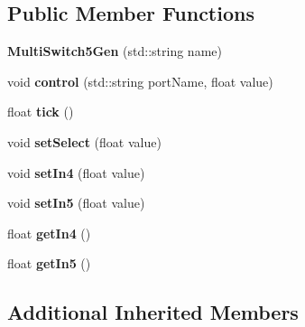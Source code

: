 \subsection*{Public Member Functions}
\begin{DoxyCompactItemize}
\item 
\hypertarget{classunit_1_1MultiSwitch5Gen_a61feb713c9bf9e11cb7f8da0c27b8faf}{{\bfseries Multi\-Switch5\-Gen} (std\-::string name)}\label{classunit_1_1MultiSwitch5Gen_a61feb713c9bf9e11cb7f8da0c27b8faf}

\item 
\hypertarget{classunit_1_1MultiSwitch5Gen_a22d5724ba74b064282da08c9600bed87}{void {\bfseries control} (std\-::string port\-Name, float value)}\label{classunit_1_1MultiSwitch5Gen_a22d5724ba74b064282da08c9600bed87}

\item 
\hypertarget{classunit_1_1MultiSwitch5Gen_a4c357bd87f34841ccfb6a95f9a820384}{float {\bfseries tick} ()}\label{classunit_1_1MultiSwitch5Gen_a4c357bd87f34841ccfb6a95f9a820384}

\item 
\hypertarget{classunit_1_1MultiSwitch5Gen_ab2c8a47e7d29e01183a02d9fbf60f0ed}{void {\bfseries set\-Select} (float value)}\label{classunit_1_1MultiSwitch5Gen_ab2c8a47e7d29e01183a02d9fbf60f0ed}

\item 
\hypertarget{classunit_1_1MultiSwitch5Gen_a47554a04fc8a495a2ce60ae87460da8d}{void {\bfseries set\-In4} (float value)}\label{classunit_1_1MultiSwitch5Gen_a47554a04fc8a495a2ce60ae87460da8d}

\item 
\hypertarget{classunit_1_1MultiSwitch5Gen_a7073be5cc2e0383aecefdf54c9dec714}{void {\bfseries set\-In5} (float value)}\label{classunit_1_1MultiSwitch5Gen_a7073be5cc2e0383aecefdf54c9dec714}

\item 
\hypertarget{classunit_1_1MultiSwitch5Gen_a97d0f025afcb8b7b5167ccaf244fc9ed}{float {\bfseries get\-In4} ()}\label{classunit_1_1MultiSwitch5Gen_a97d0f025afcb8b7b5167ccaf244fc9ed}

\item 
\hypertarget{classunit_1_1MultiSwitch5Gen_a887395fd9475f73c70b385e3af731828}{float {\bfseries get\-In5} ()}\label{classunit_1_1MultiSwitch5Gen_a887395fd9475f73c70b385e3af731828}

\end{DoxyCompactItemize}
\subsection*{Additional Inherited Members}


